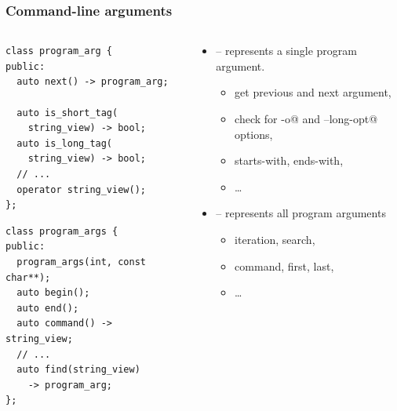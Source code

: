 \documentclass[compress,table,xcolor=table]{beamer}
\begin{document}
\begin{frame}[fragile]
  \frametitle{Command-line arguments}
  \begin{columns}
    \begin{column}{.57\textwidth}
      \begin{lstlisting}[language=c++2x,basicstyle=\scriptsize\ttfamily]
class program_arg {
public:
  auto next() -> program_arg;

  auto is_short_tag(
    string_view) -> bool;
  auto is_long_tag(
    string_view) -> bool;
  // ...
  operator string_view();
};
      \end{lstlisting}
      \vfill
      \begin{lstlisting}[language=c++2x,basicstyle=\scriptsize\ttfamily]
class program_args {
public:
  program_args(int, const char**);
  auto begin();
  auto end();
  auto command() -> string_view;
  // ...
  auto find(string_view)
    -> program_arg;
};
      \end{lstlisting}
    \end{column}
    \begin{column}{.44\textwidth}
      \small
      \begin{itemize}
        \item {} -- represents a single program argument.
        \begin{itemize}
          \smaller
          \item get previous and next argument,
          \item check for \verb@-o@ and \verb@--long-opt@ options,
          \item starts-with, ends-with,
          \item \ldots
        \end{itemize}
        \item {} -- represents all program arguments
        \begin{itemize}
          \smaller
          \item iteration, search,
          \item command, first, last,
          \item \ldots
        \end{itemize}
      \end{itemize}
    \end{column}
  \end{columns}
\end{frame}
\end{document}
